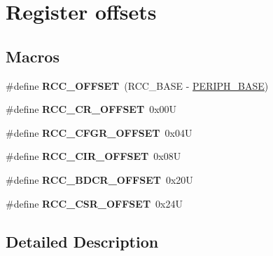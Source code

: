 \hypertarget{group___r_c_c___register___offset}{}\section{Register offsets}
\label{group___r_c_c___register___offset}
\subsection*{Macros}
\begin{DoxyCompactItemize}
\item 
\mbox{\label{group___r_c_c___register___offset_ga539e07c3b3c55f1f1d47231341fb11e1}} 
\#define {\bfseries R\+C\+C\+\_\+\+O\+F\+F\+S\+ET}~(R\+C\+C\+\_\+\+B\+A\+SE -\/ \hyperlink{group___peripheral__memory__map_ga9171f49478fa86d932f89e78e73b88b0}{P\+E\+R\+I\+P\+H\+\_\+\+B\+A\+SE})
\item 
\mbox{\label{group___r_c_c___register___offset_ga6df8d81c05c07cb0c26bbf27ea7fe55c}} 
\#define {\bfseries R\+C\+C\+\_\+\+C\+R\+\_\+\+O\+F\+F\+S\+ET}~0x00U
\item 
\mbox{\label{group___r_c_c___register___offset_gafb1e90a88869585b970749de3c16ce4a}} 
\#define {\bfseries R\+C\+C\+\_\+\+C\+F\+G\+R\+\_\+\+O\+F\+F\+S\+ET}~0x04U
\item 
\mbox{\label{group___r_c_c___register___offset_gace77000e86938c6253dc08e8c17e891a}} 
\#define {\bfseries R\+C\+C\+\_\+\+C\+I\+R\+\_\+\+O\+F\+F\+S\+ET}~0x08U
\item 
\mbox{\label{group___r_c_c___register___offset_gaf234fe5d9628a3f0769721e76f83c566}} 
\#define {\bfseries R\+C\+C\+\_\+\+B\+D\+C\+R\+\_\+\+O\+F\+F\+S\+ET}~0x20U
\item 
\mbox{\label{group___r_c_c___register___offset_ga63141585a221eed1fd009eb80e406619}} 
\#define {\bfseries R\+C\+C\+\_\+\+C\+S\+R\+\_\+\+O\+F\+F\+S\+ET}~0x24U
\end{DoxyCompactItemize}


\subsection{Detailed Description}
